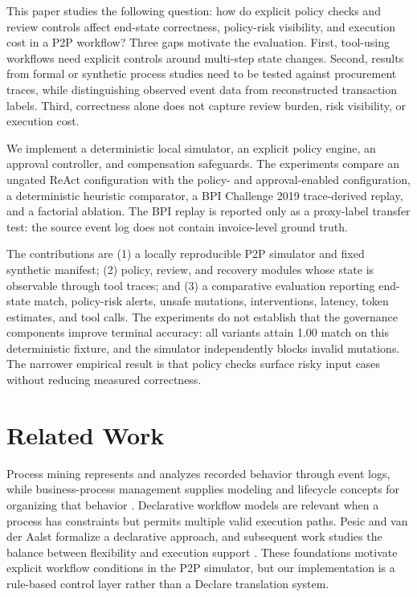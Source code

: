 \documentclass[conference]{IEEEtran}
\begin{document}
This paper studies the following question: how do explicit policy checks and review controls affect end-state correctness, policy-risk visibility, and execution cost in a P2P workflow? Three gaps motivate the evaluation. First, tool-using workflows need explicit controls around multi-step state changes. Second, results from formal or synthetic process studies need to be tested against procurement traces, while distinguishing observed event data from reconstructed transaction labels. Third, correctness alone does not capture review burden, risk visibility, or execution cost.

We implement a deterministic local simulator, an explicit policy engine, an approval controller, and compensation safeguards. The experiments compare an ungated ReAct configuration with the policy- and approval-enabled configuration, a deterministic heuristic comparator, a BPI Challenge 2019 trace-derived replay, and a factorial ablation. The BPI replay is reported only as a proxy-label transfer test: the source event log does not contain invoice-level ground truth.

The contributions are (1) a locally reproducible P2P simulator and fixed synthetic manifest; (2) policy, review, and recovery modules whose state is observable through tool traces; and (3) a comparative evaluation reporting end-state match, policy-risk alerts, unsafe mutations, interventions, latency, token estimates, and tool calls. The experiments do not establish that the governance components improve terminal accuracy: all variants attain 1.00 match on this deterministic fixture, and the simulator independently blocks invalid mutations. The narrower empirical result is that policy checks surface risky input cases without reducing measured correctness.

\section{Related Work}

Process mining represents and analyzes recorded behavior through event logs, while business-process management supplies modeling and lifecycle concepts for organizing that behavior \cite{aalst2012manifesto,aalst2016process,aalst2004workflow,dumas2018fundamentals,mendling2010guidelines}. Declarative workflow models are relevant when a process has constraints but permits multiple valid execution paths. Pesic and van der Aalst formalize a declarative approach, and subsequent work studies the balance between flexibility and execution support \cite{pesic2006declarative,aalst2009declarative}. These foundations motivate explicit workflow conditions in the P2P simulator, but our implementation is a rule-based control layer rather than a Declare translation system.
\end{document}
